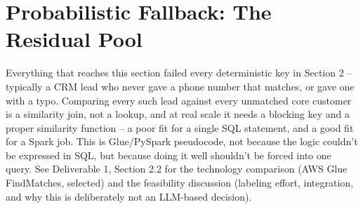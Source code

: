 \documentclass[11pt]{article}
\begin{document}
\section{Probabilistic Fallback: The Residual Pool}
Everything that reaches this section failed every deterministic key in Section 2 -- typically a CRM lead who never gave a phone number that matches, or gave one with a typo. Comparing every such lead against every unmatched core customer is a similarity join, not a lookup, and at real scale it needs a blocking key and a proper similarity function -- a poor fit for a single SQL statement, and a good fit for a Spark job. This is Glue/PySpark pseudocode, not because the logic couldn't be expressed in SQL, but because doing it well shouldn't be forced into one query. See Deliverable 1, Section 2.2 for the technology comparison (AWS Glue FindMatches, selected) and the feasibility discussion (labeling effort, integration, and why this is deliberately not an LLM-based decision).
\end{document}
